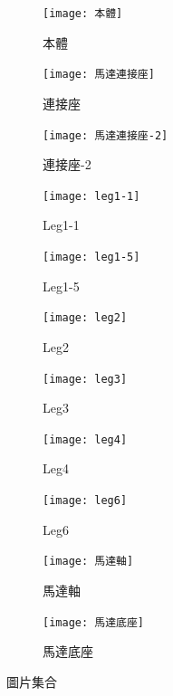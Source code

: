 \begin{figure}[htbp]
  \centering
  \begin{subfigure}[t]{0.3\linewidth}
    \centering
    \texttt{[image: 本體]}
    \caption{本體}
    \label{本體}
  \end{subfigure}
  \hfill
  \begin{subfigure}[t]{0.3\linewidth}
    \centering
    \texttt{[image: 馬達連接座]}
    \caption{連接座}
    \label{馬達連接座}
  \end{subfigure}
  \hfill
  \begin{subfigure}[t]{0.3\linewidth}
    \centering
    \texttt{[image: 馬達連接座-2]}
    \caption{連接座-2}
    \label{馬達連接座-2}
  \end{subfigure}

  \vspace{1cm} %

  \begin{subfigure}[t]{0.3\linewidth}
    \centering
    \texttt{[image: leg1-1]}
    \caption{Leg1-1}
    \label{leg1-1}
  \end{subfigure}
  \hfill
  \begin{subfigure}[t]{0.3\linewidth}
    \centering
    \texttt{[image: leg1-5]}
    \caption{Leg1-5}
    \label{leg1-5}
  \end{subfigure}
  \hfill
  \begin{subfigure}[t]{0.3\linewidth}
    \centering
    \texttt{[image: leg2]}
    \caption{Leg2}
    \label{leg2}
  \end{subfigure}

  \vspace{1cm} %

  \begin{subfigure}[t]{0.3\linewidth}
    \centering
    \texttt{[image: leg3]}
    \caption{Leg3}
    \label{leg3}
  \end{subfigure}
  \hfill
  \begin{subfigure}[t]{0.3\linewidth}
    \centering
    \texttt{[image: leg4]}
    \caption{Leg4}
    \label{leg4}
  \end{subfigure}
  \hfill
  \begin{subfigure}[t]{0.3\linewidth}
    \centering
    \texttt{[image: leg6]}
    \caption{Leg6}
    \label{leg6}
  \end{subfigure}

  \vspace{1cm} %

  \begin{subfigure}[t]{0.3\linewidth}
    \centering
    \texttt{[image: 馬達軸]}
    \caption{馬達軸}
    \label{馬達軸}
  \end{subfigure}
  \hfill
  \begin{subfigure}[t]{0.3\linewidth}
    \centering
    \texttt{[image: 馬達底座]}
    \caption{馬達底座}
    \label{馬達底座}
  \end{subfigure}

  \caption{圖片集合}
  \label{fig:圖片集合}
\end{figure}

